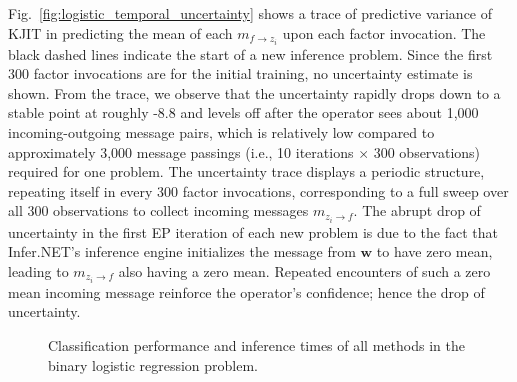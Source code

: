 \documentclass[english]{article}
\theoremstyle{plain}
\theoremstyle{plain}
\newcommand{\factor}{f}				%
\newcommand{\msg}[2]{m_{#1 \rightarrow #2}}			%
\newcommand{\figref}[1]{Fig.~\ref{#1}}
\begin{document}
\figref{fig:logistic_temporal_uncertainty} shows a trace of predictive variance 
of KJIT in predicting the mean of each $\msg{\factor}{z_i}$ upon each factor invocation. 
The black dashed lines indicate the start of a new inference problem. 
Since the first 300 factor invocations are for the initial training, 
no uncertainty estimate is shown. From the trace, we observe that the uncertainty 
rapidly drops down to a stable point at roughly -8.8 and levels 
off after the operator sees about 1,000 incoming-outgoing message pairs, 
which is relatively low compared to approximately 3,000 message passings 
(i.e., 10 iterations $\times$ 300 observations) required for one problem. 
The uncertainty trace displays a periodic structure, repeating itself in 
every 300 factor invocations, corresponding to a full sweep over all 300 
observations to collect incoming messages $\msg{z_i}{\factor}$. 
The abrupt drop of uncertainty in the first EP iteration of each new problem is 
due to the fact that Infer.NET's inference engine initializes the message from 
$\boldsymbol{w}$ to have zero mean, leading to $\msg{z_i}{\factor}$ also having a 
zero mean. Repeated encounters of such a zero mean incoming message reinforce the 
operator's confidence; hence the drop of uncertainty. 

\begin{figure}[t]
  \centering
  \caption{Classification performance and inference times of all methods in the 
  binary logistic regression problem. 
  }
  \label{fig:logistic_performance}
\end{figure}
\end{document}
